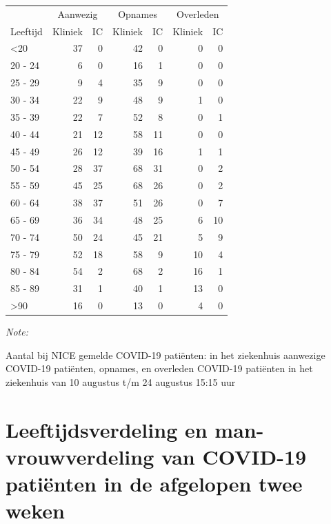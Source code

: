 \documentclass[
  english,
  man,floatsintext]{apa6}
\begin{document}
\begin{table}
\centering\begingroup\fontsize{10}{12}\selectfont

\begin{threeparttable}
\begin{tabular}{lrrrrrr}
\toprule
\multicolumn{1}{c}{ } & \multicolumn{2}{c}{Aanwezig} & \multicolumn{2}{c}{Opnames} & \multicolumn{2}{c}{Overleden} \\
\cmidrule(l{3pt}r{3pt}){2-3} \cmidrule(l{3pt}r{3pt}){4-5} \cmidrule(l{3pt}r{3pt}){6-7}
Leeftijd & Kliniek & IC & Kliniek & IC & Kliniek & IC\\
\midrule
<20 & 37 & 0 & 42 & 0 & 0 & 0\\
20 - 24 & 6 & 0 & 16 & 1 & 0 & 0\\
25 - 29 & 9 & 4 & 35 & 9 & 0 & 0\\
30 - 34 & 22 & 9 & 48 & 9 & 1 & 0\\
35 - 39 & 22 & 7 & 52 & 8 & 0 & 1\\
40 - 44 & 21 & 12 & 58 & 11 & 0 & 0\\
45 - 49 & 26 & 12 & 39 & 16 & 1 & 1\\
50 - 54 & 28 & 37 & 68 & 31 & 0 & 2\\
55 - 59 & 45 & 25 & 68 & 26 & 0 & 2\\
60 - 64 & 38 & 37 & 51 & 26 & 0 & 7\\
65 - 69 & 36 & 34 & 48 & 25 & 6 & 10\\
70 - 74 & 50 & 24 & 45 & 21 & 5 & 9\\
75 - 79 & 52 & 18 & 58 & 9 & 10 & 4\\
80 - 84 & 54 & 2 & 68 & 2 & 16 & 1\\
85 - 89 & 31 & 1 & 40 & 1 & 13 & 0\\
>90 & 16 & 0 & 13 & 0 & 4 & 0\\
\bottomrule
\end{tabular}
\begin{tablenotes}
\item \textit{Note: } 
\item Aantal bij NICE gemelde COVID-19 patiënten: in het ziekenhuis aanwezige COVID-19 patiënten, opnames, en overleden COVID-19 patiënten in het ziekenhuis van 10 augustus t/m 24 augustus 15:15 uur
\end{tablenotes}
\end{threeparttable}
\endgroup{}
\end{table}

\newpage

\hypertarget{leeftijdsverdeling-en-man-vrouwverdeling-van-covid-19-patiuxebnten-in-de-afgelopen-twee-weken}{%
\section{Leeftijdsverdeling en man-vrouwverdeling van COVID-19 patiënten in de afgelopen twee weken}\label{leeftijdsverdeling-en-man-vrouwverdeling-van-covid-19-patiuxebnten-in-de-afgelopen-twee-weken}}
\end{document}
